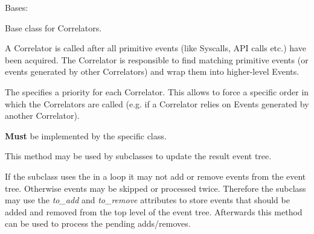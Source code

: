 \documentclass[letterpaper,10pt,english]{sphinxmanual}
\begin{document}

\begin{fulllineitems}
\label{ambrosia:ambrosia.Correlator}
Bases: 

Base class for Correlators.

A Correlator is called after all primitive events (like Syscalls, API calls etc.) have been acquired. The Correlator
is responsible to find matching primitive events (or events generated by other Correlators) and wrap them into
higher-level Events.

The  specifies a priority for each Correlator. This allows to force a
specific order in which the Correlators are called (e.g. if a Correlator relies on Events generated by another
Correlator).

\begin{fulllineitems}
\label{ambrosia:ambrosia.Correlator.correlate}
\textbf{Must} be implemented by the specific class.

\end{fulllineitems}


\begin{fulllineitems}
\label{ambrosia:ambrosia.Correlator.update_tree}
This method may be used by subclasses to update the result event tree.

If the subclass uses the  in a loop it may not add or remove events from
the event tree. Otherwise events may be skipped or processed twice. Therefore the subclass may use the \emph{to\_add}
and \emph{to\_remove} attributes to store events that should be added and removed from the top level of the event
tree. Afterwards this method can be used to process the pending adds/removes.

\end{fulllineitems}


\end{fulllineitems}

\end{document}
